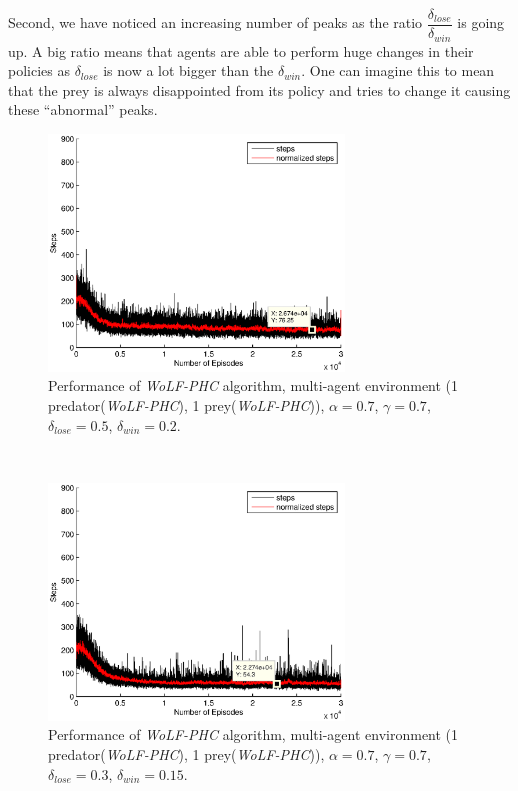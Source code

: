 \documentclass[a4paper,11pt]{article}
\begin{document}
Second, we have noticed an increasing number of peaks as the ratio $\dfrac{\delta_{lose}}{\delta_{win}}$ is going up. A big ratio means that agents are able to perform huge changes in their policies as $\delta_{lose}$ is now a lot bigger than the $\delta_{win}$. One can imagine this to mean that the prey is always disappointed from its policy and tries to change it causing these ``abnormal'' peaks.

\begin{figure}[ht!]
  \centering
    \includegraphics[width=0.7\textwidth]{figures/w07070502.eps}
    \caption{Performance of  \textit{WoLF-PHC} algorithm, multi-agent environment (1 predator(\textit{WoLF-PHC}), 1 prey(\textit{WoLF-PHC})), $\alpha = 0.7$, $\gamma = 0.7$, $\delta_{lose} = 0.5$, $\delta_{win} = 0.2$.}
    \label{w111}
\end{figure}
~
\begin{figure}[ht!]
  \centering
    \includegraphics[width=0.7\textwidth]{figures/w070703015.eps}
       \caption{Performance of  \textit{WoLF-PHC} algorithm, multi-agent environment (1 predator(\textit{WoLF-PHC}), 1 prey(\textit{WoLF-PHC})), $\alpha = 0.7$, $\gamma = 0.7$, $\delta_{lose} = 0.3$, $\delta_{win} = 0.15$.}
    \label{w112}
\end{figure}
\end{document}
